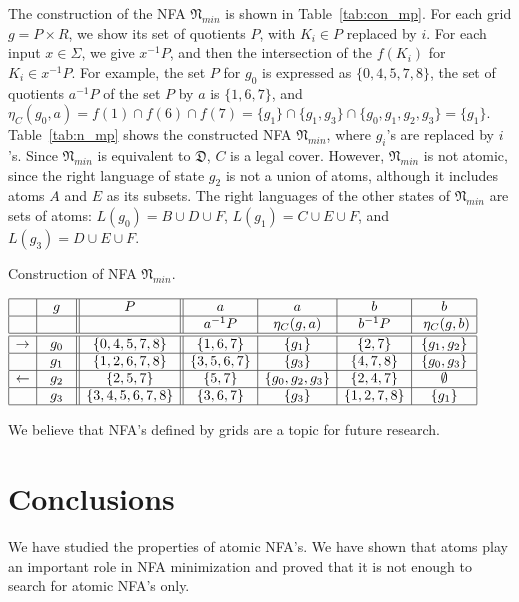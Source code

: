 \documentclass{llncs}
\newcommand{\emp}{\emptyset}
\newcommand{\Sig}{\Sigma}
\newcommand{\fD}{{\mathfrak D}}
\newcommand{\fN}{{\mathfrak N}}
\begin{document}
The construction of the NFA $\fN_{min}$ is shown in Table~\ref{tab:con_mp}.
For each grid $g=P\times R$, we show its set of quotients $P$, with
$K_i\in P$ replaced by $i$.
For each input $x\in\Sig$, we give $x^{-1}P$, and then the intersection 
of the $f(K_i)$ for $K_i\in x^{-1}P$. 
For example, the set $P$ for $g_0$ is expressed as $\{0,4,5,7,8\}$,
the set of quotients $a^{-1}P$ of the set $P$ by $a$ is $\{1,6,7\}$, and 
$\eta_C(g_0,a)=f(1) \cap f(6) \cap f(7) = 
\{g_1\} \cap \{g_1,g_3\} \cap \{g_0,g_1,g_2,g_3\}= \{g_1\}$.
Table~\ref{tab:n_mp} shows the constructed NFA $\fN_{min}$, 
where $g_i$'s are replaced by $i$'s.
Since $\fN_{min}$ is equivalent to $\fD$,  $C$ is a legal cover.
However, $\fN_{min}$ is not atomic, since the right language of 
state $g_2$ is not a union of atoms, although it includes atoms $A$ and $E$ as
its subsets. The right languages of the other states of $\fN_{min}$ are sets of atoms:
$L(g_0)=B\cup D\cup F$, 
$L(g_1)=C\cup E\cup F$, and   
$L(g_3)=D\cup E\cup F$.


\begin{table}
\caption{Construction of NFA $\fN_{min}$.}
\label{tab:con_mp}
\begin{center}
$
\begin{array}{|c| c||c|| c| c|c|c|c|}    
\hline
& \ \ g \ \  & P
&\ \ a \ \ & a &\ \ b \ \  &b  \\
\hline  
 &  & 
 & a^{-1}P &\ \eta_C(g,a) \ & b^{-1}P &\ \eta_C(g,b) \\
\hline
\hline  
\rightarrow & g_0 &\{0,4,5,7,8\}
&  \{1,6,7\} & \{g_1\} & \{2,7\} &\{g_1,g_2\}\\
\hline  
& g_1 &\{1,2,6,7,8\} & \{3,5,6,7\}
&  \{g_3\} &  \{4,7,8\}  & \{g_0,g_3\} \\
\hline  
\leftarrow & g_2 &\{2,5,7\} & \{5,7\}
& \{g_0,g_2,g_3\}& \{2,4,7\} & \emp \\
\hline  
& g_3 &\{3,4,5,6,7,8\} & \{3,6,7\}
&  \{g_3\} &  \{1,2,7,8\}  & \{g_1\} \\
\hline  
\end{array}
$
\end{center}
\end{table}



We believe that NFA's defined by grids are a topic for future research.


\section{Conclusions}
\label{sec:conc}
We have studied the properties of atomic NFA's.
We have shown that atoms play an important role in NFA minimization and
proved that it is not enough to search for atomic NFA's only.
\end{document}

